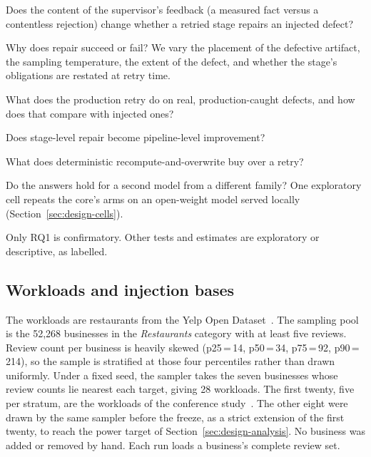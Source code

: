 \begin{description}[leftmargin=1.2em,style=nextline]
\item[RQ1 (confirmatory).] Does the content of the supervisor's feedback (a
  measured fact versus a contentless rejection) change whether a retried stage
  repairs an injected defect?
\item[RQ2.] Why does repair succeed or fail? We vary the placement of the
  defective artifact, the sampling temperature, the extent of the defect, and
  whether the stage's obligations are restated at retry time.
\item[RQ3.] What does the production retry do on real, production-caught
  defects, and how does that compare with injected ones?
\item[RQ4.] Does stage-level repair become pipeline-level improvement?
\item[RQ5.] What does deterministic recompute-and-overwrite buy over a retry?
\item[RQ6.] Do the answers hold for a second model from a different family?
  One exploratory cell repeats the core's arms on an open-weight model served
  locally (Section~\ref{sec:design-cells}).
\end{description}

Only RQ1 is confirmatory. Other tests and estimates are exploratory or descriptive, as labelled.

\subsection{Workloads and injection bases}
\label{sec:design-workloads}

The workloads are restaurants from the Yelp Open Dataset~\citep{yelpdataset}.
The sampling pool is the 52{,}268 businesses in the \emph{Restaurants} category
with at least five reviews. Review count per business is heavily skewed
(p25\,=\,14, p50\,=\,34, p75\,=\,92, p90\,=\,214), so the sample is stratified
at those four percentiles rather than drawn uniformly. Under a fixed seed, the
sampler takes the seven businesses whose review counts lie nearest each target,
giving 28 workloads. The first twenty, five per stratum, are the workloads of
the conference study~\citep{hoang2026eas}. The other eight were drawn by the
same sampler before the freeze, as a strict extension of the first twenty, to
reach the power target of Section~\ref{sec:design-analysis}. No business was
added or removed by hand. Each run loads a business's complete review set.

